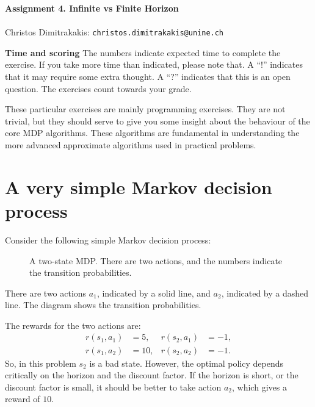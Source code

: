 \documentclass[twoside,a4paper]{article}
\begin{document}
\Large{\bf Assignment 4. Infinite vs Finite Horizon}
\vspace{1em}
\\
\vspace{1em}
\\
\large{Christos Dimitrakakis:} \texttt{christos.dimitrakakis@unine.ch}

\vspace{1em}

\textbf{Time and scoring} The numbers indicate expected time to complete the exercise. If you take more time than indicated, please note that. A ``!'' indicates that it may require some extra thought. A ``?'' indicates that this is an open question. The exercises count towards your grade.

These particular exercises are mainly programming exercises. They are not trivial, but they should serve to give you some insight about the behaviour of the core MDP algorithms. These algorithms are fundamental in understanding the more advanced approximate algorithms used in practical problems.

\section{A very simple Markov decision process}
Consider the following simple Markov decision process:
\begin{figure}[h]
  \centering
  \caption{A two-state MDP. There are two actions, and the numbers indicate the transition probabilities.}
  \label{fig:two-state-mdp}
\end{figure}
There are two actions $a_1$, indicated by a solid line, and $a_2$, indicated by a dashed line. The diagram shows the transition probabilities. 

The rewards for the two actions are:
\begin{align}
  \label{eq:1}
  r(s_1, a_1) &= 5, & r(s_2, a_1) &= -1,
  \\
  r(s_1, a_2) &= 10, & r(s_2, a_2) &= -1.
\end{align}
So, in this problem $s_2$ is a bad state. However, the optimal policy depends critically on the horizon and the discount factor. If the horizon is short, or the discount factor is small, it should be better to take action $a_2$, which gives a reward of $10$.
\end{document}
